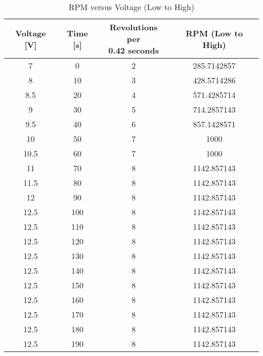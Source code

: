 \documentclass[12pt,a4paper]{report}
\begin{document}
\begin{table}[htbp]
\centering
\caption{RPM versus Voltage (Low to High)}\label{tab:rpm_voltage_low_to_high}
\begin{tabular}{cccc}
\toprule
	\textbf{Voltage [V]} & \textbf{Time [s]} & \makecell[c]{\textbf{Revolutions per}\\\textbf{0.42 seconds}} & \textbf{RPM (Low to High)} \\
\midrule
7     & 0    & 2  & 285.7142857 \\
8     & 10   & 3  & 428.5714286 \\
8.5   & 20   & 4  & 571.4285714 \\
9     & 30   & 5  & 714.2857143 \\
9.5   & 40   & 6  & 857.1428571 \\
10    & 50   & 7  & 1000 \\
10.5  & 60   & 7  & 1000 \\
11    & 70   & 8  & 1142.857143 \\
11.5  & 80   & 8  & 1142.857143 \\
12    & 90   & 8  & 1142.857143 \\
12.5  & 100  & 8  & 1142.857143 \\
12.5  & 110  & 8  & 1142.857143 \\
12.5  & 120  & 8  & 1142.857143 \\
12.5  & 130  & 8  & 1142.857143 \\
12.5  & 140  & 8  & 1142.857143 \\
12.5  & 150  & 8  & 1142.857143 \\
12.5  & 160  & 8  & 1142.857143 \\
12.5  & 170  & 8  & 1142.857143 \\
12.5  & 180  & 8  & 1142.857143 \\
12.5  & 190  & 8  & 1142.857143 \\
\bottomrule
\end{tabular}
\end{table}
\end{document}

